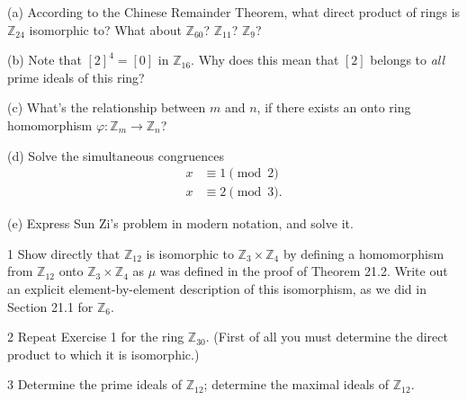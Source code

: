 \begin{problem}[Warmup]{(a)}
    According to the Chinese Remainder Theorem, what direct product of rings is $\mathbb{Z}_{24}$ isomorphic to? What about $\mathbb{Z}_{60}$? $\mathbb{Z}_{11}$? $\mathbb{Z}_9$?
\end{problem}
\unsolved

\begin{problem}[Warmup]{(b)}
    Note that $[2]^4 = [0]$ in $\mathbb{Z}_{16}$. Why does this mean that $[2]$ belongs to \emph{all} prime ideals of this ring?
\end{problem}
\unsolved

\begin{problem}[Warmup]{(c)}
    What's the relationship between $m$ and $n$, if there exists an onto ring homomorphism $\varphi : \mathbb{Z}_m \to \mathbb{Z}_n$?
\end{problem}
\unsolved

\begin{problem}[Warmup]{(d)}
    Solve the simultaneous congruences \begin{align*} x &\equiv 1 \pmod{2} \\ x &\equiv 2 \pmod{3}. \end{align*}
\end{problem}
\unsolved

\begin{problem}[Warmup]{(e)}
    Express Sun Zi's problem in modern notation, and solve it.
\end{problem}
\unsolved

\begin{problem}{1}
    Show directly that $\mathbb{Z}_{12}$ is isomorphic to $\mathbb{Z}_3 \times \mathbb{Z}_4$
    by defining a homomorphism from $\mathbb{Z}_{12}$ onto $\mathbb{Z}_3 \times \mathbb{Z}_4$
    as $\mu$ was defined in the proof of Theorem 21.2. Write out an explicit
    element-by-element description of this isomorphism, as we did in Section 21.1 for
    $\mathbb{Z}_6$.
\end{problem}
\unsolved

\begin{problem}{2}
    Repeat Exercise 1 for the ring $\mathbb{Z}_{30}$. (First of all you must determine the
    direct product to which it is isomorphic.)
\end{problem}
\unsolved

\begin{problem}{3}
    Determine the prime ideals of $\mathbb{Z}_{12}$; determine the maximal ideals of
    $\mathbb{Z}_{12}$.
\end{problem}
\unsolved

